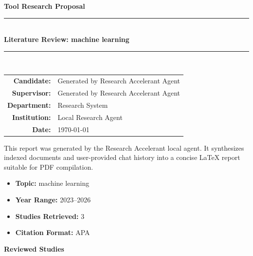 \documentclass[11pt,a4paper]{article}
\newcommand{\hr}{\rule{\linewidth}{0.5mm}}
\newcommand{\projecttitle}{Literature Review: machine learning}
\newcommand{\candidate}{Generated by Research Accelerant Agent}
\newcommand{\supervisor}{Generated by Research Accelerant Agent}
\newcommand{\institution}{Local Research Agent}
\newcommand{\department}{Research System}
\newcommand{\dateprep}{\today}
\begin{document}
\thispagestyle{empty}
\begin{center}
    \vspace*{0.5cm}
    {\large \textbf{Tool Research Proposal}}\\[0.5cm]
    \hr\\[0.4cm]
    {\huge \bfseries \color{unalblue} \projecttitle}\\[0.4cm]
    \hr\\[1.2cm]

    \begin{tabular}{rl}
        \textbf{Candidate:} & \candidate \\ 
        \textbf{Supervisor:} & \supervisor \\ 
        \textbf{Department:} & \department \\ 
        \textbf{Institution:} & \institution \\ 
        \textbf{Date:} & \dateprep
    \end{tabular}
    \vspace{1.2cm}

    \begin{tcolorbox}[colback=boxbg, colframe=unalblue, title=Abstract, fonttitle=\bfseries]
        This report was generated by the Research Accelerant local agent. It synthesizes indexed documents and user-provided chat history into a concise LaTeX report suitable for PDF compilation.
    \end{tcolorbox}
\end{center}
\vfill
\clearpage

\tableofcontents
\clearpage




\begin{resultbox}
\begin{itemize}[leftmargin=*]
    \item \textbf{Topic:} machine learning
    \item \textbf{Year Range:} 2023--2026
    \item \textbf{Studies Retrieved:} 3
    \item \textbf{Citation Format:} APA
\end{itemize}
\end{resultbox}

\vspace{1em}

\textbf{\large Reviewed Studies}\par\vspace{0.5em}
\end{document}
